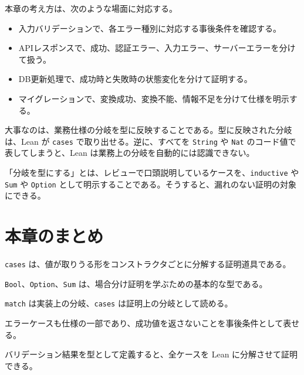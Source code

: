 本章の考え方は、次のような場面に対応する。

\begin{itemize}
\item 入力バリデーションで、各エラー種別に対応する事後条件を確認する。
\item APIレスポンスで、成功、認証エラー、入力エラー、サーバーエラーを分けて扱う。
\item DB更新処理で、成功時と失敗時の状態変化を分けて証明する。
\item マイグレーションで、変換成功、変換不能、情報不足を分けて仕様を明示する。
\end{itemize}

大事なのは、業務仕様の分岐を型に反映することである。型に反映された分岐は、Lean が \texttt{cases} で取り出せる。逆に、すべてを \texttt{String} や \texttt{Nat} のコード値で表してしまうと、Lean は業務上の分岐を自動的には認識できない。

\begin{softwarebox}
「分岐を型にする」とは、レビューで口頭説明しているケースを、\texttt{inductive} や \texttt{Sum} や \texttt{Option} として明示することである。そうすると、漏れのない証明の対象にできる。
\end{softwarebox}

\section{本章のまとめ}

\texttt{cases} は、値が取りうる形をコンストラクタごとに分解する証明道具である。

\texttt{Bool}、\texttt{Option}、\texttt{Sum} は、場合分け証明を学ぶための基本的な型である。

\texttt{match} は実装上の分岐、\texttt{cases} は証明上の分岐として読める。

エラーケースも仕様の一部であり、成功値を返さないことを事後条件として表せる。

バリデーション結果を型として定義すると、全ケースを Lean に分解させて証明できる。
